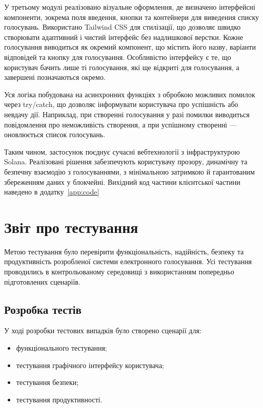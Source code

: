 \documentclass[14pt]{extreport}
\begin{document}
  У третьому модулі реалізовано візуальне оформлення, де визначено інтерфейсні компоненти, зокрема поля введення, кнопки та контейнери для виведення списку голосувань. Використано Tailwind CSS для стилізації, що дозволяє швидко створювати адаптивний і чистий інтерфейс без надлишкової верстки. Кожне голосування виводиться як окремий компонент, що містить його назву, варіанти відповідей та кнопку для голосування. Особливістю інтерфейсу є те, що користувач бачить лише ті голосування, які ще відкриті для голосування, а завершені позначаються окремо.

  Уся логіка побудована на асинхронних функціях з обробкою можливих помилок через try/catch, що дозволяє інформувати користувача про успішність або невдачу дії. Наприклад, при створенні голосування у разі помилки виводиться повідомлення про неможливість створення, а при успішному створенні — оновлюється список голосувань.

  Таким чином, застосунок поєднує сучасні вебтехнології з інфраструктурою Solana. Реалізовані рішення забезпечують користувачу прозору, динамічну та безпечну взаємодію з голосуваннями, з мінімальною затримкою й гарантованим збереженням даних у блокчейні.  Вихідний код частини клієнтської частини наведено в додатку~\ref{app:code}
    
  \section{Звіт про тестування}
  
  Метою тестування було перевірити функціональність, надійність, безпеку та продуктивність розробленої системи електронного голосування. Усі тестування проводились в контрольованому середовищі з використанням попередньо підготовлених сценаріїв.
  
  \subsection{Розробка тестів}
  
  У ході розробки тестових випадків було створено сценарії для:
  
  \begin{itemize}
    \item функціонального тестування;
    \item тестування графічного інтерфейсу користувача;
    \item тестування безпеки;
    \item тестування продуктивності.
  \end{itemize}
  
\end{document}
